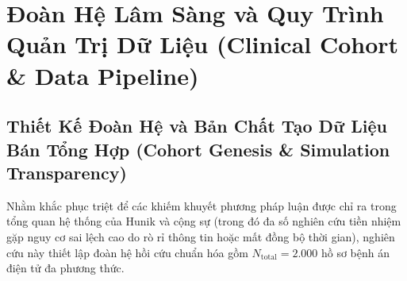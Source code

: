 \section{Đoàn Hệ Lâm Sàng và Quy Trình Quản Trị Dữ Liệu (Clinical Cohort \& Data Pipeline)}
\label{sec:clinical_cohort}

\subsection{Thiết Kế Đoàn Hệ và Bản Chất Tạo Dữ Liệu Bán Tổng Hợp (Cohort Genesis \& Simulation Transparency)}
Nhằm khắc phục triệt để các khiếm khuyết phương pháp luận được chỉ ra trong tổng quan hệ thống của Hunik và cộng sự \cite{hunik2024diagnostic} (trong đó đa số nghiên cứu tiền nhiệm gặp nguy cơ sai lệch cao do rò rỉ thông tin hoặc mất đồng bộ thời gian), nghiên cứu này thiết lập đoàn hệ hồi cứu chuẩn hóa gồm $N_{\text{total}} = 2.000$ hồ sơ bệnh án điện tử đa phương thức. 

